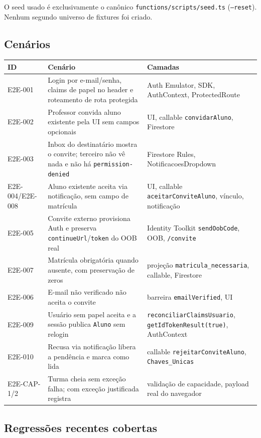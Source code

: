 O seed usado é exclusivamente o canônico \texttt{functions/scripts/seed.ts}
(\texttt{--reset}). Nenhum segundo universo de fixtures foi criado.

\subsection{Cenários}

\begin{longtable}{@{}p{}p{}p{}@{}}
\toprule
ID & Cenário & Camadas \\
\midrule
\endhead
E2E-001 & Login por e-mail/senha, claims de papel no header e roteamento de
  rota protegida & Auth Emulator, SDK, AuthContext, ProtectedRoute \\
E2E-002 & Professor convida aluno existente pela UI sem campos opcionais &
  UI, callable \texttt{convidarAluno}, Firestore \\
E2E-003 & Inbox do destinatário mostra o convite; terceiro não vê nada e não há
  \texttt{permission-denied} & Firestore Rules, NotificacoesDropdown \\
E2E-004/E2E-008 & Aluno existente aceita via notificação, sem campo de
  matrícula & UI, callable \texttt{aceitarConviteAluno}, vínculo, notificação \\
E2E-005 & Convite externo provisiona Auth e preserva \texttt{continueUrl}/\texttt{token}
  do OOB real & Identity Toolkit \texttt{sendOobCode}, OOB, \texttt{/convite} \\
E2E-007 & Matrícula obrigatória quando ausente, com preservação de zeros &
  projeção \texttt{matricula\_necessaria}, callable, Firestore \\
E2E-006 & E-mail não verificado não aceita o convite & barreira \texttt{emailVerified}, UI \\
E2E-009 & Usuário sem papel aceita e a sessão publica \texttt{Aluno} sem
  relogin & \texttt{reconciliarClaimsUsuario}, \texttt{getIdTokenResult(true)},
  AuthContext \\
E2E-010 & Recusa via notificação libera a pendência e marca como lida &
  callable \texttt{rejeitarConviteAluno}, \texttt{Chaves\_Unicas} \\
E2E-CAP-1/2 & Turma cheia sem exceção falha; com exceção justificada registra &
  validação de capacidade, payload real do navegador \\
\bottomrule
\end{longtable}

\subsection{Regressões recentes cobertas}

